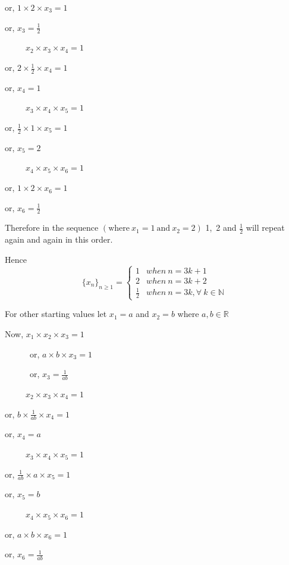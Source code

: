 \documentclass{article}
\begin{document}
\begin{enumerate}
or, $1\times 2\times x_3=1$
 
or, $x_3=\frac{1}{2}$
 \bigskip
 
 \ \ \ \ \ $x_2\times x_3 \times x_4=1$
 
 or, $2\times \frac{1}{2}\times x_4=1$
 
 or, $x_4=1$
  \bigskip
 
 \ \ \ \ \ $x_3\times x_4 \times x_5=1$
 
 or, $\frac{1}{2} \times 1\times x_5=1$
 
 or, $x_5=2$
 
\bigskip
 
 \ \ \ \ \ $x_4\times x_5 \times x_6=1$
 
 or, $1 \times 2\times x_6=1$
 
 or, $x_6=\frac{1}{2}$
 
 Therefore in the sequence $(\text{where}\ x_1=1\ \text{and}\ x_2=2)$ 1,\ 2 and $\frac{1}{2}$ will repeat again and again in this order.
 
 Hence
 \begin{equation}
   \{x_n \}_{n\geq 1}=  
     \begin{cases}
       1 & when \ n=3k+1\\
       2 & when  \ n=3k+2\\
       \frac{1}{2} & when \  n=3k, \forall \  k\in \mathbb{N}
     \end{cases} 
 \end{equation}
 \bigskip
 
 
 For other starting values let $x_1=a$ and $x_2=b$ where $a,b\in \mathbb{R}$
 
Now, $x_1\times x_2 \times x_3=1$
 
 \ \ \ \ \ \ or, $a\times b\times x_3=1$
 
 \ \ \ \ \ \ or, $x_3=\frac{1}{ab}$
  \bigskip
 
 \ \ \ \ \ $x_2\times x_3 \times x_4=1$
 
 or, $b\times \frac{1}{ab}\times x_4=1$
 
 or, $x_4=a$
  \bigskip
 
 \ \ \ \ \ $x_3\times x_4 \times x_5=1$
 
 or, $\frac{1}{ab} \times a\times x_5=1$
 
 or, $x_5=b$
 
\bigskip
 
 \ \ \ \ \ $x_4\times x_5 \times x_6=1$
 
 or, $a \times b\times x_6=1$
 
 or, $x_6=\frac{1}{ab}$
 

\end{enumerate}
\end{document}
